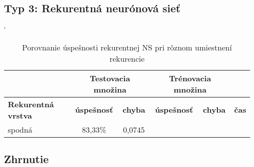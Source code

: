 \todo

\subsection{Typ 3: Rekurentná neurónová sieť}
\todo

\begin{table}[h]
\catcode` %
\centering
\begin{tabular}{|l|c|c|c|c|c|}
\cline{2-5}
\multicolumn{1}{l}{} & \multicolumn{2}{|c|}{\textbf{Testovacia množina}} & \multicolumn{2}{c|}{\textbf{Trénovacia množina}} & \multicolumn{1}{l}{}\\ 
\hline
\textbf{Rekurentná vrstva} & \textbf{úspešnosť} & \textbf{chyba} & \textbf{úspešnosť} & \textbf{chyba} & \textbf{čas} \\ \hline
spodná & 83,33\% & 0,0745 & & &\\ \hline
\end{tabular}
\caption{Porovnanie úspešnosti rekurentnej NS pri rôznom umiestnení rekurencie}
\label{tab:neuroncountcmp2}
\end{table}

\subsection{Zhrnutie}


\todo






